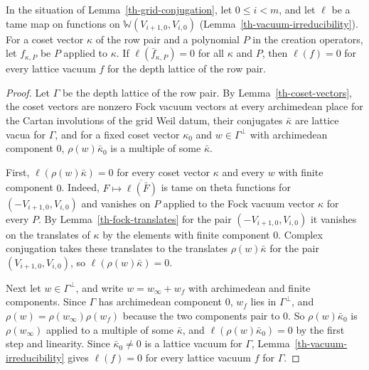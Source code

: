 \begin{lemma}\label{th-fock-span}
In the situation of Lemma~\ref{th-grid-conjugation}, let $0\leq i<m$, and let
$\ell$ be a tame map on functions on $\mathbb W(V_{i+1,0},V_{i,0})$
(Lemma~\ref{th-vacuum-irreducibility}). For a coset vector $\kappa$ of the row
pair and a polynomial $P$ in the creation operators, let $f_{\kappa,P}$ be $P$
applied to $\kappa$. If $\ell(\bar f_{\kappa,P})=0$ for all $\kappa$ and $P$,
then $\ell(f)=0$ for every lattice vacuum $f$ for the depth lattice of the row
pair.
\end{lemma}
\begin{proof}
Let $\Gamma$ be the depth lattice of the row pair. By
Lemma~\ref{th-coset-vectors}, the coset vectors are nonzero Fock vacuum
vectors at every archimedean place for the Cartan involutions of the grid Weil
datum, their conjugates $\bar\kappa$ are lattice vacua for $\Gamma$, and for a
fixed coset vector $\kappa_0$ and $w\in\Gamma^\perp$ with archimedean component
$0$, $\rho(w)\bar\kappa_0$ is a multiple of some $\bar\kappa$.

First, $\ell(\rho(w)\bar\kappa)=0$ for every coset vector $\kappa$ and every $w$
with finite component $0$. Indeed, $F\mapsto\overline{\ell(\bar F)}$ is tame on
theta functions for $(-V_{i+1,0},V_{i,0})$ and vanishes on $P$ applied to the
Fock vacuum vector $\kappa$ for every $P$. By Lemma~\ref{th-fock-translates}
for the pair $(-V_{i+1,0},V_{i,0})$ it vanishes on the translates of $\kappa$
by the elements with finite component $0$. Complex conjugation takes these
translates to the translates $\rho(w)\bar\kappa$ for the pair
$(V_{i+1,0},V_{i,0})$, so $\ell(\rho(w)\bar\kappa)=0$.

Next let $w\in\Gamma^\perp$, and write $w=w_\infty+w_f$ with archimedean and
finite components. Since $\Gamma$ has archimedean component $0$, $w_f$ lies in
$\Gamma^\perp$, and $\rho(w)=\rho(w_\infty)\rho(w_f)$ because the two components
pair to $0$. So $\rho(w)\bar\kappa_0$ is $\rho(w_\infty)$ applied to a
multiple of some $\bar\kappa$, and $\ell(\rho(w)\bar\kappa_0)=0$ by the first
step and linearity. Since $\bar\kappa_0\neq0$ is a lattice vacuum for $\Gamma$,
Lemma~\ref{th-vacuum-irreducibility} gives $\ell(f)=0$ for every lattice vacuum
$f$ for $\Gamma$.
\end{proof}

